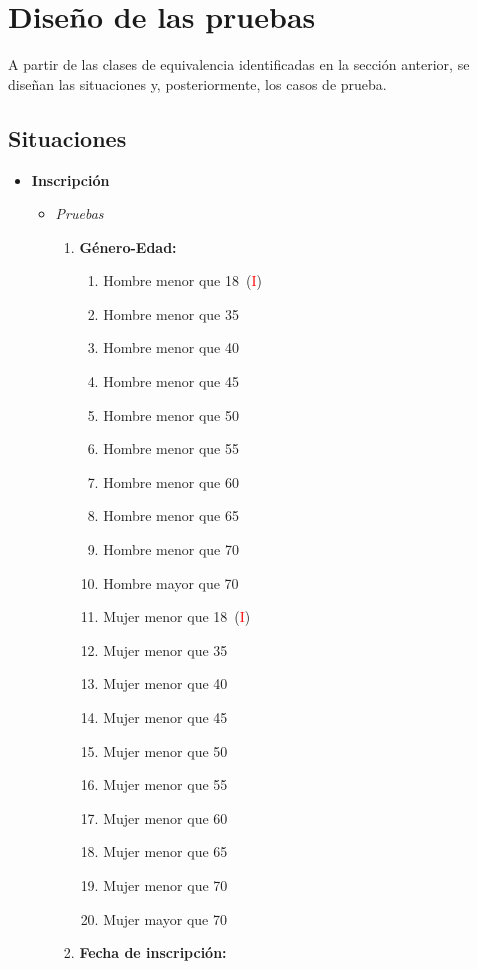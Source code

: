 \chapter{Diseño de las pruebas}
A partir de las clases de equivalencia identificadas en la sección anterior,
se diseñan las situaciones y, posteriormente, los casos de prueba.

\section{Situaciones}
\begin{itemize}
	\item \textbf{Inscripción}
		\begin{itemize}
			\item \textit{Pruebas}
				\begin{enumerate}[label*=SPI\arabic*.]
					\item \textbf{Género-Edad:} \begin{enumerate}[label*=\arabic*]
						\item Hombre menor que 18~(\textcolor{red}{I})
						\item Hombre menor que 35
						\item Hombre menor que 40
						\item Hombre menor que 45
						\item Hombre menor que 50
						\item Hombre menor que 55
						\item Hombre menor que 60
						\item Hombre menor que 65
						\item Hombre menor que 70
						\item Hombre mayor que 70
						\item Mujer menor que 18~(\textcolor{red}{I})
						\item Mujer menor que 35
						\item Mujer menor que 40
						\item Mujer menor que 45
						\item Mujer menor que 50
						\item Mujer menor que 55
						\item Mujer menor que 60
						\item Mujer menor que 65
						\item Mujer menor que 70
						\item Mujer mayor que 70
					\end{enumerate}
					\item \textbf{Fecha de inscripción:} \begin{enumerate}[label*=\arabic*]

\end{enumerate}
\end{enumerate}
\end{itemize}
\end{itemize}
